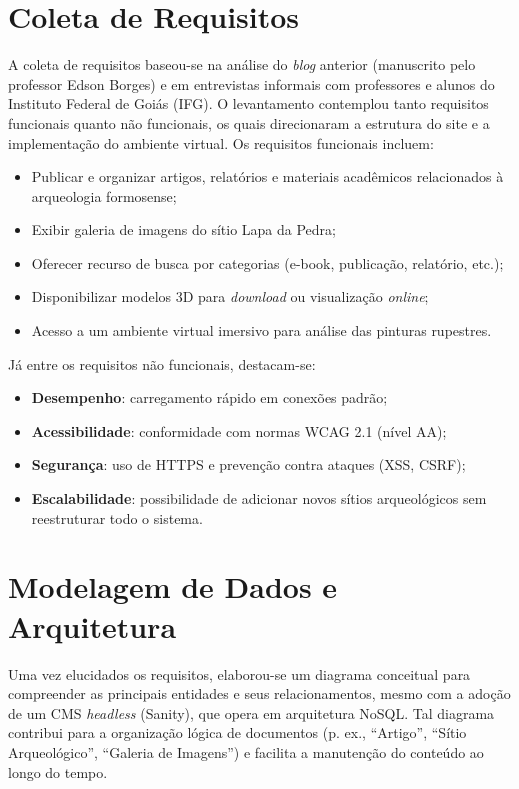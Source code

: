 \section{Coleta de Requisitos}
\label{sec:coleta_requisitos}

A coleta de requisitos baseou-se na análise do \textit{blog} anterior (manuscrito pelo professor Edson Borges) e em entrevistas informais com professores e alunos do Instituto Federal de Goiás (IFG). O levantamento contemplou tanto requisitos funcionais quanto não funcionais, os quais direcionaram a estrutura do site e a implementação do ambiente virtual. Os requisitos funcionais incluem:

\begin{itemize}
    \item Publicar e organizar artigos, relatórios e materiais acadêmicos relacionados à arqueologia formosense;
    \item Exibir galeria de imagens do sítio Lapa da Pedra;
    \item Oferecer recurso de busca por categorias (e-book, publicação, relatório, etc.);
    \item Disponibilizar modelos 3D para \textit{download} ou visualização \textit{online};
    \item Acesso a um ambiente virtual imersivo para análise das pinturas rupestres.
\end{itemize}

Já entre os requisitos não funcionais, destacam-se:
\begin{itemize}
    \item \textbf{Desempenho}: carregamento rápido em conexões padrão;
    \item \textbf{Acessibilidade}: conformidade com normas WCAG 2.1 (nível AA);
    \item \textbf{Segurança}: uso de HTTPS e prevenção contra ataques (XSS, CSRF);
    \item \textbf{Escalabilidade}: possibilidade de adicionar novos sítios arqueológicos sem reestruturar todo o sistema.
\end{itemize}

\section{Modelagem de Dados e Arquitetura}
\label{sec:modelagem_arquitetura}

Uma vez elucidados os requisitos, elaborou-se um diagrama conceitual para compreender as principais entidades e seus relacionamentos, mesmo com a adoção de um CMS \textit{headless} (Sanity), que opera em arquitetura NoSQL. Tal diagrama contribui para a organização lógica de documentos (p. ex., “Artigo”, “Sítio Arqueológico”, “Galeria de Imagens”) e facilita a manutenção do conteúdo ao longo do tempo.

